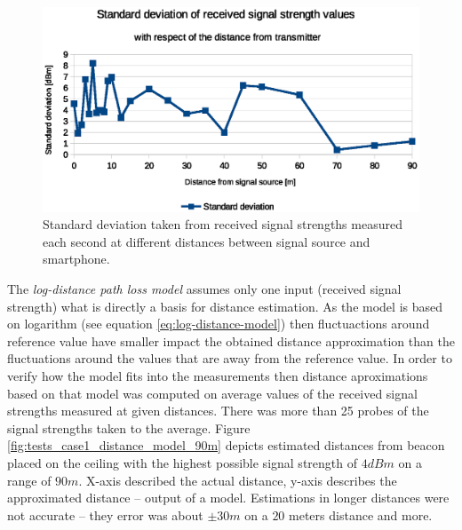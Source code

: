 \documentclass[../main.tex]{subfiles}
\begin{document}
\begin{figure}[!htbp]
\includegraphics[width=\textwidth, keepaspectratio]{pictures/tests_case1_fluctuations_over_time_std_dev}
\centering
\caption{Standard deviation taken from received signal strengths measured each second at different distances between signal source and smartphone.}
\label{fig:tests_case1_fluctuations_over_time_std_dev}
\end{figure}

The \textit{log-distance path loss model} assumes only one input (received signal strength) what is directly a basis for distance estimation. As the model is based on logarithm (see equation \ref{eq:log-distance-model}) then fluctuactions around reference value have smaller impact the obtained distance approximation than the fluctuations around the values that are away from the reference value. In order to verify how the model fits into the measurements then distance aproximations based on that model was computed on average values of the received signal strengths measured at given distances. There was more than 25 probes of the signal strengths taken to the average. Figure \ref{fig:tests_case1_distance_model_90m} depicts estimated distances from beacon placed on the ceiling with the highest possible signal strength of $4dBm$ on a range of $90 m$. X-axis described the actual distance, y-axis describes the approximated distance -- output of a model. Estimations in longer distances were not accurate -- they error was about $\pm 30m$ on a $20$ meters distance and more.
\end{document}
